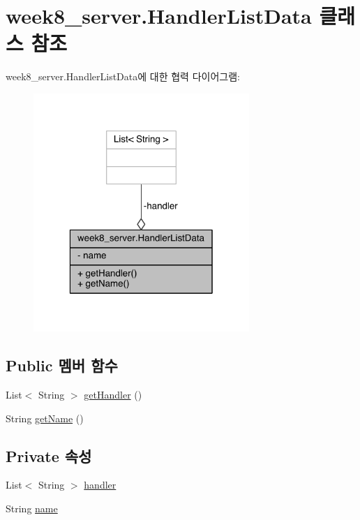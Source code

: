 \hypertarget{classweek8__server_1_1_handler_list_data}{\section{week8\-\_\-server.\-Handler\-List\-Data 클래스 참조}
\label{classweek8__server_1_1_handler_list_data}
}


week8\-\_\-server.\-Handler\-List\-Data에 대한 협력 다이어그램\-:
\nopagebreak
\begin{figure}[H]
\begin{center}
\leavevmode
\includegraphics[width=232pt]{classweek8__server_1_1_handler_list_data__coll__graph}
\end{center}
\end{figure}
\subsection*{Public 멤버 함수}
\begin{DoxyCompactItemize}
\item 
List$<$ String $>$ \hyperlink{classweek8__server_1_1_handler_list_data_a1f90cf96677728ec88e603b59ae80e8e}{get\-Handler} ()
\item 
String \hyperlink{classweek8__server_1_1_handler_list_data_aa7ac90f82d504b25610eb401c729f57d}{get\-Name} ()
\end{DoxyCompactItemize}
\subsection*{Private 속성}
\begin{DoxyCompactItemize}
\item 
List$<$ String $>$ \hyperlink{classweek8__server_1_1_handler_list_data_a6905ecd2a867500c1096d5543b36bb91}{handler}
\item 
String \hyperlink{classweek8__server_1_1_handler_list_data_a6b207124eddb629f42eb688e7e107df1}{name}
\end{DoxyCompactItemize}


